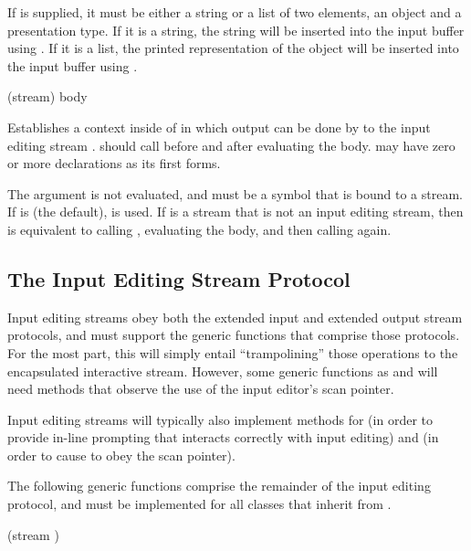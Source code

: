 If  is supplied, it must be either a string or a list of
two elements, an object and a presentation type.  If it is a string, the string
will be inserted into the input buffer using .  If it is a
list, the printed representation of the object will be inserted into the input
buffer using .


 {(\optional stream) \body body}

Establishes a context inside of  in which output can be
done by  to the input editing stream .
 should call  before and after
evaluating the body.   may have zero or more declarations as its first
forms.

The  argument is not evaluated, and must be a symbol that is bound
to a stream.  If  is  (the default),  is used.
If  is a stream that is not an input editing stream, then
 is equivalent to calling ,
evaluating the body, and then calling  again.


\subsection {The Input Editing Stream Protocol}

Input editing streams obey both the extended input and extended output stream
protocols, and must support the generic functions that comprise those protocols.
For the most part, this will simply entail ``trampolining'' those operations to
the encapsulated interactive stream.  However, some generic functions as
 and  will need methods that
observe the use of the input editor's scan pointer.

Input editing streams will typically also implement methods for
 (in order to provide in-line prompting that interacts
correctly with input editing) and  (in order to cause
 to obey the scan pointer).

The following generic functions comprise the remainder of the input editing
protocol, and must be implemented for all classes that inherit from
.


 {(stream )}

